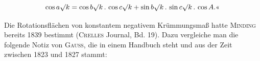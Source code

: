 \[
\cos a\mathord{\surd}k = \cos b\mathord{\surd}k \,.\, \cos c\mathord{\surd}k + \sin b\mathord{\surd}k \,.\, \sin c\mathord{\surd}k \,.\, \cos A.\text{«}
\]

Die Rotationsflächen von konstantem negativem Krümmungsmaß hatte \textsc{Minding} bereits 1839 bestimmt (\textsc{Crelles} Journal, Bd. 19). Dazu vergleiche man die folgende Notiz von \textsc{Gauss}, die in einem Handbuch steht und aus der Zeit zwischen 1823 und 1827 stammt:
